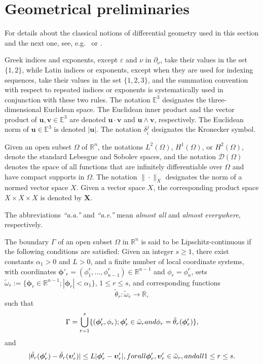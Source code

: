 \documentclass{amsart}
\begin{document}
\section{Geometrical preliminaries}
\label{Sec:1}

For details about the classical notions of differential geometry used in this section and the next one, see, e.g.~\cite{Ciarlet2000} or \cite{Ciarlet2005}.

Greek indices and exponents, except $\varepsilon$ and $\nu$ in $\partial_{\nu}$, take their values in the set $\{1,2\}$, while Latin indices or exponents, except when they are used for indexing sequences, take their values in the set $\{1,2,3\}$, and the summation convention with respect to repeated indices or exponents is systematically used in conjunction with these two rules. The notation $\mathbb{E}^3$ designates the three-dimensional Euclidean space. The Euclidean inner product and the vector product of $\bm{u}, \bm{v} \in \mathbb{E}^3$ are denoted $\bm{u} \cdot \bm{v}$ and $\bm{u} \wedge \bm{v}$, respectively. The Euclidean norm of $\bm{u} \in \mathbb{E}^3$ is denoted $|\bm{u}|$. The notation $\delta^j_i$ designates the Kronecker symbol.

Given an open subset $\Omega$ of $\mathbb{R}^n$, the notations $L^2(\Omega)$, $H^1(\Omega)$, or $H^2 (\Omega)$, denote the standard Lebesgue and Sobolev spaces, and the notation $\mathcal{D}(\Omega)$ denotes the space of all functions that are infinitely differentiable over $\Omega$ and have compact supports in $\Omega$. The notation $\|\cdot\|_X$ designates the norm of a normed vector space $X$. Given a vector space $X$, the corresponding product space $X \times X \times X$ is denoted by $\bm{X}$.

The abbreviations \emph{``a.a.''} and \emph{``a.e.''} mean \emph{almost all} and \emph{almost everywhere}, respectively.

The boundary $\Gamma$ of an open subset $\Omega$ in $\mathbb{R}^n$ is said to be Lipschitz-continuous if the following conditions are satisfied: Given an integer $s\ge 1$, there exist constants $\alpha_1>0$ and $L>0$, and a finite number of local coordinate systems, with coordinates $\bm{\phi}'_r=(\phi_1^r, \dots, \phi_{n-1}^r) \in \mathbb{R}^{n-1}$ and $\phi_r=\phi_n^r$, sets $\tilde{\omega}_r:=\{\bm{\phi}_r \in\mathbb{R}^{n-1}; |\bm{\phi}_r|<\alpha_1\}$, $1 \le r \le s$, and corresponding functions
$$
\tilde{\theta}_r:\tilde{\omega}_r\to\mathbb{R},
$$
such that
$$
\Gamma=\bigcup_{r=1}^s \{(\bm{\phi}'_r,\phi_r); \bm{\phi}'_r \in \tilde{\omega}_r \textup{ and }\phi_r=\tilde{\theta}_r(\bm{\phi}'_r)\},
$$
and 
$$
|\tilde{\theta}_r(\bm{\phi}'_r)-\tilde{\theta}_r(\bm{\upsilon}'_r)|\le L |\bm{\phi}'_r-\bm{\upsilon}'_r|, \textup{ for all }\bm{\phi}'_r, \bm{\upsilon}'_r \in \tilde{\omega}_r, \textup{ and all }1\le r\le s.
$$
\end{document}
